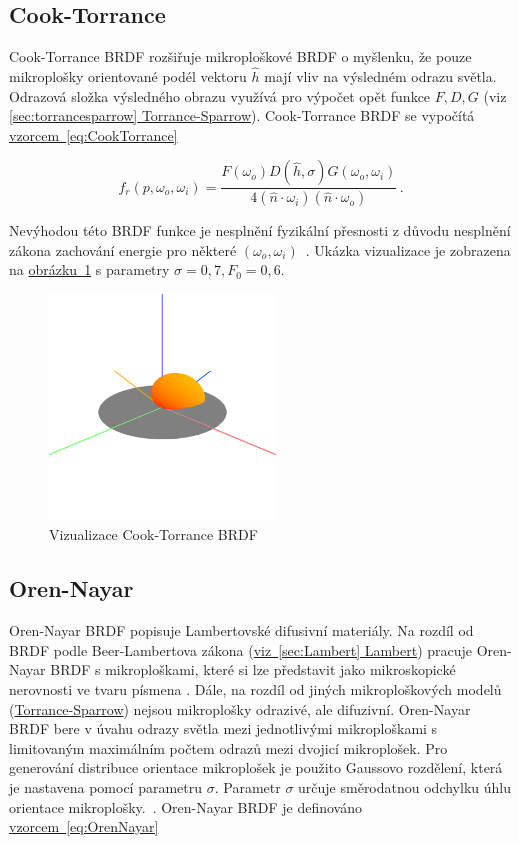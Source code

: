 \documentclass[czech,master]{diploma}
\newcommand{\uvec}[1]{\hat{#1}}
\newcommand{\point}{p}
\newcommand{\brdf}{f_r\left(\point,\omega_{o},\omega_{i}\right)}
\newcommand{\normVec}{\uvec{n}}
\newcommand{\inVec}{\omega_{i}}
\newcommand{\outVec}{\omega_{o}}
\newcommand{\halfVec}{\uvec{h}}
\newcommand{\rough}{\sigma}
\newcommand{\Fzero}{F_0}
\begin{document}
\subsection{Cook-Torrance}
Cook-Torrance BRDF rozšiřuje mikroploškové BRDF o myšlenku, že pouze mikroplošky orientované podél vektoru \(\halfVec\) mají vliv na výsledném odrazu světla. Odrazová složka výsledného obrazu využívá pro výpočet opět funkce \(F, D, G\) (viz \hyperref[sec:torrancesparrow]{\ref{sec:torrancesparrow} Torrance-Sparrow}). Cook-Torrance BRDF se vypočítá \hyperref[eq:CookTorrance]{vzorcem~\ref{eq:CookTorrance}}~\cite{CookTorranceBRDF}

\begin{equation} \label{eq:CookTorrance}
  \brdf  = \frac{F(\outVec) D(\halfVec,\rough) G(\outVec,\inVec)}{4 (\normVec\cdot\inVec) (\normVec\cdot\outVec)}\,.
\end{equation}

Nevýhodou této BRDF funkce je nesplnění fyzikální přesnosti z důvodu nesplnění zákona zachování energie pro některé \(\left(\outVec,\inVec\right)\)~\cite{BRDFOverview}. Ukázka vizualizace je zobrazena na \hyperref[fig:cookTorranceBRDFRender]{obrázku~\ref{fig:cookTorranceBRDFRender}} s parametry \(\rough=0{,}7, \Fzero = 0{,}6\).


\begin{figure}[ht]%
  \centering\includegraphics[width=6cm]{Figures/visualizations/brdfCookTorrance.png}%
  \caption{Vizualizace Cook-Torrance BRDF}%
  \label{fig:cookTorranceBRDFRender}%
\end{figure}

\subsection{Oren-Nayar}
Oren-Nayar BRDF popisuje Lambertovské difusivní materiály. Na rozdíl od BRDF podle Beer-Lambertova zákona (\hyperref[sec:Lambert]{viz~\ref{sec:Lambert} Lambert}) pracuje Oren-Nayar BRDF s mikroploškami, které si lze představit jako mikroskopické nerovnosti ve tvaru písmena . Dále, na rozdíl od jiných mikroploškových modelů (\hyperref[sec:torrancesparrow]{Torrance-Sparrow}) nejsou mikroplošky odrazivé, ale difuzivní. Oren-Nayar BRDF bere v úvahu odrazy světla mezi jednotlivými mikroploškami s limitovaným maximálním počtem odrazů mezi dvojicí mikroplošek. Pro generování distribuce orientace mikroplošek je použito Gaussovo rozdělení, která je nastavena pomocí parametru \(\rough\). Parametr \(\rough\) určuje směrodatnou odchylku úhlu orientace mikroplošky.~\cite{BRDFOverview, OrenNayar}. Oren-Nayar BRDF je definováno \hyperref[eq:OrenNayar]{vzorcem~\ref{eq:OrenNayar}}
\end{document}
